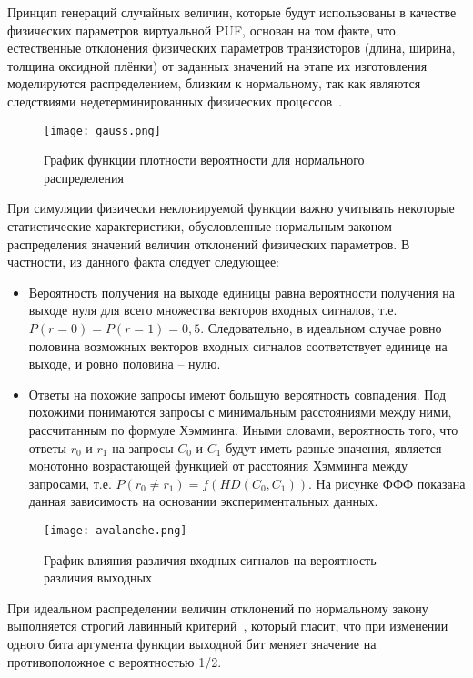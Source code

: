 Принцип генераций случайных величин, которые будут использованы в качестве физических параметров виртуальной PUF, основан на том факте, что естественные отклонения физических параметров транзисторов (длина, ширина, толщина оксидной плёнки) от заданных значений на этапе их изготовления моделируются распределением, близким к нормальному, так как являются следствиями недетерминированных физических процессов~\cite{gauss_wiki,process_variation}.

\begin{figure}[!h]
    \centering
    \texttt{[image: gauss.png]}
    \caption{График функции плотности вероятности для нормального распределения}
    \label{fig:architecture:normal_pd}
\end{figure}

При симуляции физически неклонируемой функции важно учитывать некоторые статистические характеристики, обусловленные нормальным законом распределения значений величин отклонений физических параметров. В частности, из данного факта следует следующее:
\begin{itemize}
  \item Вероятность получения на выходе единицы равна вероятности получения на выходе нуля для всего множества векторов входных сигналов, т.е. $P(r = 0) = P(r = 1) = 0,5 $. Следовательно, в идеальном случае ровно половина возможных векторов входных сигналов соответствует единице на выходе, и ровно половина -- нулю.
  \item Ответы на похожие запросы имеют большую вероятность совпадения. Под похожими понимаются запросы с минимальным расстояниями между ними, рассчитанным по формуле Хэмминга. Иными словами, вероятность того, что ответы $r_0$ и $r_1$ на запросы $C_0$ и $C_1$ будут иметь разные значения, является монотонно возрастающей функцией от расстояния Хэмминга между запросами, т.е. $P(r_0 \neq r_1) = f(HD(C_0, C_1))$. На рисунке ФФФ показана данная зависимость на основании экспериментальных данных.
\end{itemize}

\begin{figure}[!h]
    \centering
    \texttt{[image: avalanche.png]}
    \caption{График влияния различия входных сигналов на вероятность различия выходных}
    \label{fig:architecture:avalanche}
\end{figure}

При идеальном распределении величин отклонений по нормальному закону выполняется строгий лавинный критерий~\cite{rfid0_puf}, который гласит, что при изменении одного бита аргумента функции выходной бит меняет значение на противоположное с вероятностью 1/2.

